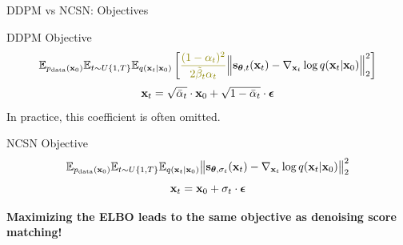 \documentclass{beamer}
\begin{document}
\begin{frame}{DDPM vs NCSN: Objectives}
	\begin{block}{DDPM Objective}
		\vspace{-0.5cm}
		\[
			\bbE_{\pd(\bx_0)} \bbE_{t \sim U\{1, T\}}\bbE_{q(\bx_t | \bx_0)} \left[ {\color{olive}\frac{(1 - \alpha_t)^2}{2\tilde{\beta}_t \alpha_t}} \Bigl\|  \bs_{\btheta, t} (\bx_t) - \nabla_{\bx_t} \log q(\bx_t | \bx_0) \Bigr\|_2^2  \right]
		\]
		\[
			\mathbf{x}_t = \sqrt{\bar{\alpha}_t} \cdot \mathbf{x}_0 + \sqrt{1 - \bar{\alpha}_t} \cdot \boldsymbol{\epsilon}
		\]
		\eqpause
		In practice, {\color{olive}this coefficient} is often omitted.
	\end{block}
	\eqpause
	\begin{block}{NCSN Objective}
		\vspace{-0.3cm}
		\[
			\mathbb{E}_{p_{\text{data}}(\mathbf{x}_0)} \mathbb{E}_{t \sim U\{1, T\}} \mathbb{E}_{q(\mathbf{x}_t | \mathbf{x}_0)}\bigl\| \mathbf{s}_{\boldsymbol{\theta}, \sigma_t}(\mathbf{x}_t) - \nabla_{\mathbf{x}_t} \log q(\mathbf{x}_t | \mathbf{x}_0) \bigr\|^2_2 
		\]
		\[
			\mathbf{x}_t = \mathbf{x}_0 + \sigma_t \cdot \boldsymbol{\epsilon}
		\]
		\vspace{-0.5cm}
	\end{block}
	\eqpause
	\textbf{Maximizing the ELBO leads to the same objective as denoising score matching!}
\end{frame}
\end{document}
